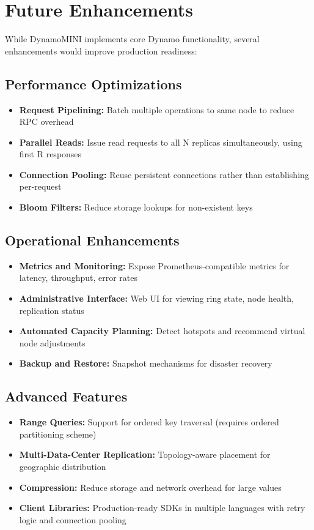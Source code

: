 \documentclass[conference]{IEEEtran}
\begin{document}
\section{Future Enhancements}

While DynamoMINI implements core Dynamo functionality, several enhancements would improve production readiness:

\subsection{Performance Optimizations}
\begin{itemize}
    \item \textbf{Request Pipelining:} Batch multiple operations to same node to reduce RPC overhead
    \item \textbf{Parallel Reads:} Issue read requests to all N replicas simultaneously, using first R responses
    \item \textbf{Connection Pooling:} Reuse persistent connections rather than establishing per-request
    \item \textbf{Bloom Filters:} Reduce storage lookups for non-existent keys
\end{itemize}

\subsection{Operational Enhancements}
\begin{itemize}
    \item \textbf{Metrics and Monitoring:} Expose Prometheus-compatible metrics for latency, throughput, error rates
    \item \textbf{Administrative Interface:} Web UI for viewing ring state, node health, replication status
    \item \textbf{Automated Capacity Planning:} Detect hotspots and recommend virtual node adjustments
    \item \textbf{Backup and Restore:} Snapshot mechanisms for disaster recovery
\end{itemize}

\subsection{Advanced Features}
\begin{itemize}
    \item \textbf{Range Queries:} Support for ordered key traversal (requires ordered partitioning scheme)
    \item \textbf{Multi-Data-Center Replication:} Topology-aware placement for geographic distribution
    \item \textbf{Compression:} Reduce storage and network overhead for large values
    \item \textbf{Client Libraries:} Production-ready SDKs in multiple languages with retry logic and connection pooling
\end{itemize}
\end{document}
